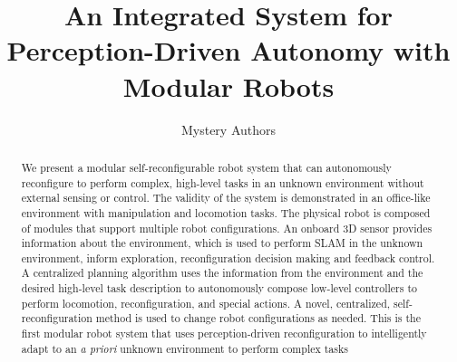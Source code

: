 \documentclass[conference]{IEEEtran}
\begin{document}
\title{An Integrated System for Perception-Driven Autonomy with Modular Robots}

\author{Mystery Authors}


\maketitle

\begin{abstract}

We present a modular self-reconfigurable robot system that can autonomously reconfigure to perform complex, high-level tasks in an unknown environment without external sensing or control. The validity of the system is demonstrated in an office-like environment with manipulation and locomotion tasks. The physical robot is composed of modules that support multiple robot configurations. An onboard 3D sensor provides information about the environment, which is used to perform SLAM in the unknown environment, inform exploration, reconfiguration decision making and feedback control.  A centralized planning algorithm uses the information from the environment and the desired high-level task description to autonomously compose low-level controllers to perform locomotion, reconfiguration, and special actions. A novel, centralized, self-reconfiguration method is used to change robot configurations as needed. This is the first modular robot system that uses perception-driven reconfiguration to intelligently adapt to an \textit{a priori} unknown environment to perform complex tasks

\end{abstract}

\IEEEpeerreviewmaketitle

\end{document}
